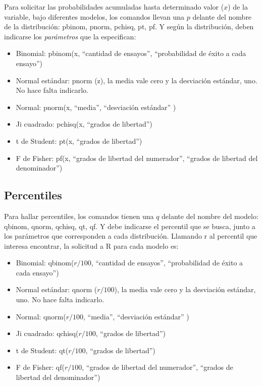 \documentclass[]{book}
\providecommand{\tightlist}{%
  \setlength{\itemsep}{0pt}\setlength{\parskip}{0pt}}
\begin{document}
Para solicitar las probabilidades acumuladas hasta determinado valor (\(x\)) de la variable, bajo diferentes modelos, los comandos llevan una \(p\) delante del nombre de la distribución: pbinom, pnorm, pchisq, pt, pf. Y según la distribución, deben indicarse los \emph{parámetros} que la especifican:

\begin{itemize}
\tightlist
\item
  Binomial: pbinom(x, ``cantidad de ensayos'', ``probabilidad de éxito a cada ensayo'')
\item
  Normal estándar: pnorm (z), la media vale cero y la desviación estándar, uno. No hace falta indicarlo.
\item
  Normal: pnorm(x, ``media'', ``desviación estándar'' )
\item
  Ji cuadrado: pchisq(x, ``grados de libertad'')
\item
  t de Student: pt(x, ``grados de libertad'')
\item
  F de Fisher: pf(x, ``grados de libertad del numerador'', ``grados de libertad del denominador'')
\end{itemize}

\hypertarget{percentiles-1}{%
\subsection{Percentiles}\label{percentiles-1}}

Para hallar percentiles, los comandos tienen una \(q\) delante del nombre del modelo: qbinom, qnorm, qchisq, qt, qf. Y debe indicarse el percentil que se busca, junto a los parámetros que corresponden a cada distribución. Llamando r al percentil que interesa encontrar, la solicitud a R para cada modelo es:

\begin{itemize}
\tightlist
\item
  Binomial: qbinom(\(r/100\), ``cantidad de ensayos'', ``probabilidad de éxito a cada ensayo'')
\item
  Normal estándar: qnorm (\(r/100\)), la media vale cero y la desviación estándar, uno. No hace falta indicarlo.
\item
  Normal: qnorm(\(r/100\), ``media'', ``desviación estándar'' )
\item
  Ji cuadrado: qchisq(\(r/100\), ``grados de libertad'')
\item
  t de Student: qt(\(r/100\), ``grados de libertad'')
\item
  F de Fisher: qf(\(r/100\), ``grados de libertad del numerador'', ``grados de libertad del denominador'')
\end{itemize}
\end{document}
